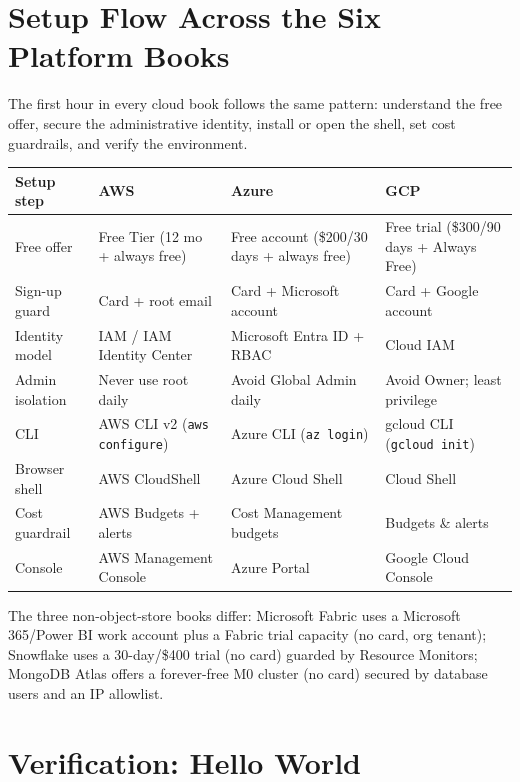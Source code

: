 \section{Setup Flow Across the Six Platform Books}
\begin{crosscloud}
The first hour in every cloud book follows the same pattern: understand the free offer, secure the administrative identity, install or open the shell, set cost guardrails, and verify the environment.

\vspace{2mm}
{\footnotesize
\begin{tabular}{@{}p{2.9cm}p{3.0cm}p{3.0cm}p{3.0cm}@{}}
\toprule
\textbf{Setup step} & \textbf{AWS} & \textbf{Azure} & \textbf{GCP} \\
\midrule
Free offer & Free Tier (12 mo + always free) & Free account (\$200/30 days + always free) & Free trial (\$300/90 days + Always Free) \\
Sign-up guard & Card + root email & Card + Microsoft account & Card + Google account \\
Identity model & IAM / IAM Identity Center & Microsoft Entra ID + RBAC & Cloud IAM \\
Admin isolation & Never use root daily & Avoid Global Admin daily & Avoid Owner; least privilege \\
CLI & AWS CLI v2 (\texttt{aws configure}) & Azure CLI (\texttt{az login}) & gcloud CLI (\texttt{gcloud init}) \\
Browser shell & AWS CloudShell & Azure Cloud Shell & Cloud Shell \\
Cost guardrail & AWS Budgets + alerts & Cost Management budgets & Budgets \& alerts \\
Console & AWS Management Console & Azure Portal & Google Cloud Console \\
\bottomrule
\end{tabular}}

\vspace{1mm}
The three non-object-store books differ: Microsoft Fabric uses a Microsoft 365/Power BI work account plus a Fabric trial capacity (no card, org tenant); Snowflake uses a 30-day/\$400 trial (no card) guarded by Resource Monitors; MongoDB Atlas offers a forever-free M0 cluster (no card) secured by database users and an IP allowlist.
\end{crosscloud}

\section{Verification: Hello World}
